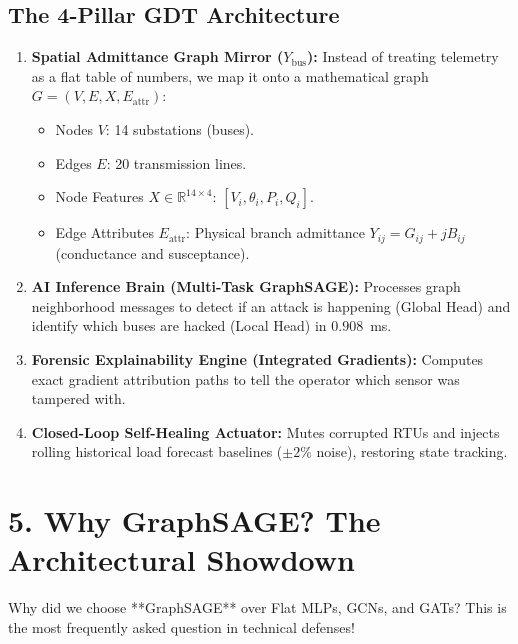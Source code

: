 \documentclass[10pt,a4paper]{article}
\begin{document}
\subsection{The 4-Pillar GDT Architecture}
\begin{enumerate}
    \item \textbf{Spatial Admittance Graph Mirror ($Y_{\text{bus}}$):}
    Instead of treating telemetry as a flat table of numbers, we map it onto a mathematical graph $G = (V, E, X, E_{\text{attr}})$:
    \begin{itemize}[noitemsep]
        \item Nodes $V$: 14 substations (buses).
        \item Edges $E$: 20 transmission lines.
        \item Node Features $X \in \mathbb{R}^{14 \times 4}$: $[V_i, \theta_i, P_i, Q_i]$.
        \item Edge Attributes $E_{\text{attr}}$: Physical branch admittance $Y_{ij} = G_{ij} + jB_{ij}$ (conductance and susceptance).
    \end{itemize}
    \item \textbf{AI Inference Brain (Multi-Task GraphSAGE):}
    Processes graph neighborhood messages to detect if an attack is happening (Global Head) and identify which buses are hacked (Local Head) in $0.908$~ms.
    \item \textbf{Forensic Explainability Engine (Integrated Gradients):}
    Computes exact gradient attribution paths to tell the operator which sensor was tampered with.
    \item \textbf{Closed-Loop Self-Healing Actuator:}
    Mutes corrupted RTUs and injects rolling historical load forecast baselines ($\pm 2\%$ noise), restoring state tracking.
\end{enumerate}

\section{5. Why GraphSAGE? The Architectural Showdown}

Why did we choose **GraphSAGE** over Flat MLPs, GCNs, and GATs? This is the most frequently asked question in technical defenses!
\end{document}
